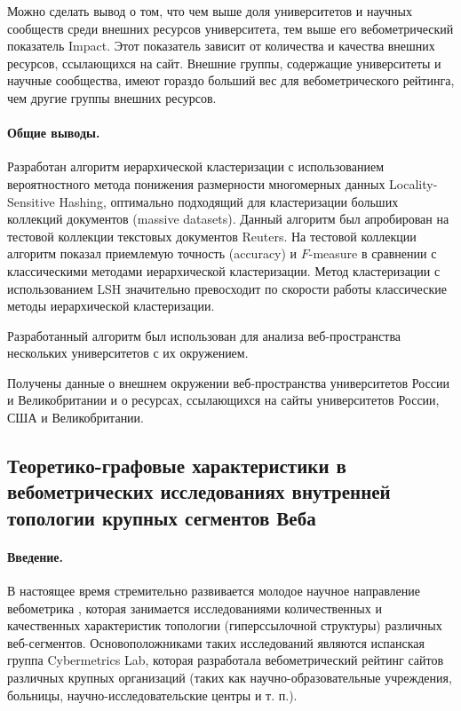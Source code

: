 Можно сделать вывод о том, что чем выше доля университетов и научных сообществ среди внешних ресурсов университета, тем выше его вебометрический показатель Impact. Этот показатель зависит от количества и качества внешних ресурсов, ссылающихся на сайт. Внешние группы, содержащие университеты и научные сообщества, имеют гораздо больший вес для вебометрического рейтинга, чем другие группы внешних ресурсов.

\paragraph{Общие выводы.} Разработан алгоритм иерархической кластеризации с использованием вероятностного метода понижения размерности многомерных данных Locality-Sensitive Hashing, оптимально подходящий для кластеризации больших коллекций документов (massive datasets). Данный алгоритм был апробирован на тестовой коллекции текстовых документов Reuters. На тестовой коллекции алгоритм показал приемлемую точность (accuracy) и \(F\)-measure в сравнении с классическими методами иерархической кластеризации. Метод кластеризации с использованием LSH значительно превосходит по скорости работы классические методы иерархической кластеризации.

Разработанный алгоритм был использован для анализа веб-пространства нескольких университетов с их окружением.

Получены данные о внешнем окружении веб-пространства университетов России и Великобритании и о ресурсах, ссылающихся на сайты университетов России, США и Великобритании.

\subsection{Теоретико-графовые характеристики в вебометрических исследованиях внутренней топологии крупных сегментов Веба}\label{subsec:ch1/sec4/sub8}

\paragraph{Введение.} В настоящее время стремительно развивается молодое научное направление вебометрика \cite{AlmindIngwersen,Thelwall,Pechnikov}, которая занимается исследованиями количественных и качественных характеристик топологии (гиперссылочной структуры) различных веб-сегментов. Основоположниками таких исследований являются испанская группа Cybermetrics Lab, которая разработала вебометрический рейтинг сайтов различных крупных организаций \cite{RankingWeb} (таких как научно-образовательные учреждения, больницы, научно-исследовательские центры и т. п.).  

